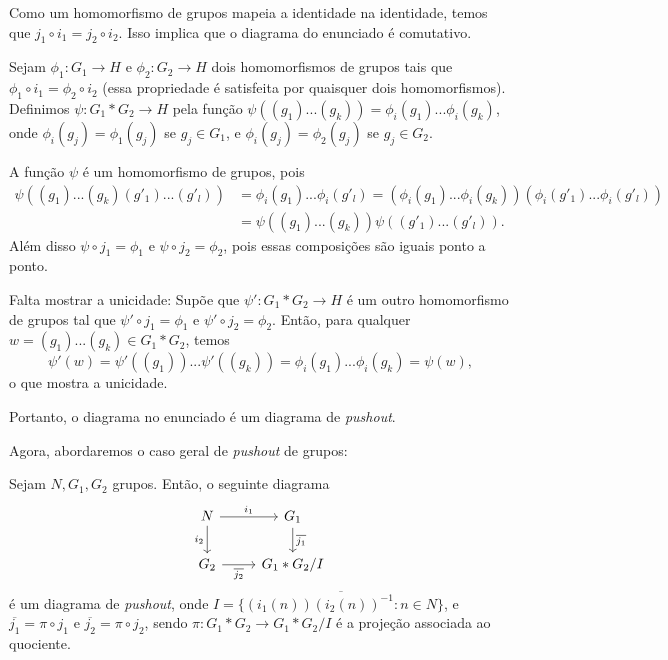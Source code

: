\begin{dem}
    Como um homomorfismo de grupos mapeia a identidade na identidade, temos que $j_1\circ i_1=j_2\circ i_2$. Isso implica que o diagrama do enunciado é comutativo.
    
    Sejam $\phi_1:G_1\rightarrow H$ e $\phi_2: G_2\rightarrow H$ dois homomorfismos de grupos tais que $\phi_1\circ i_1=\phi_2\circ i_2$ (essa propriedade é satisfeita por quaisquer dois homomorfismos). Definimos $\psi: G_1*G_2\rightarrow H$ pela função $\psi((g_1)...(g_k))=\phi_i(g_1)...\phi_i(g_k)$, onde $\phi_i(g_j)=\phi_1(g_j)$ se $g_j\in G_1$, e $\phi_i(g_j)=\phi_2(g_j)$ se $g_j\in G_2$. 
    
    A função $\psi$ é um homomorfismo de grupos, pois   
    \begin{align*}
    \psi((g_1)...(g_k)(g'_1)...(g'_l))&=\phi_i(g_1)...\phi_i(g'_l)=(\phi_i(g_1)...\phi_i(g_k))(\phi_i(g'_1)...\phi_i(g'_l))\\
    &=\psi((g_1)...(g_k))\psi((g'_1)...(g'_l)).
    \end{align*}
    Além disso $\psi\circ j_1=\phi_1$ e $\psi\circ j_2=\phi_2$, pois essas composições são iguais ponto a ponto. 
    
    Falta mostrar a unicidade: Supõe que $\psi':G_1*G_2\rightarrow H$ é um outro homomorfismo de grupos tal que $\psi'\circ j_1=\phi_1$ e $\psi'\circ j_2=\phi_2$. Então, para qualquer $w=(g_1)...(g_k)\in G_1* G_2$, temos 
    \[\psi'(w)=\psi'((g_1))...\psi'((g_k))=\phi_i(g_1)...\phi_i(g_k)=\psi(w),\]
    o que mostra a unicidade.
    
    Portanto, o diagrama no enunciado é um diagrama de \emph{pushout}.
\end{dem}

Agora, abordaremos o caso geral de \emph{pushout} de grupos:

\begin{thm}
    Sejam $N,G_1,G_2$ grupos. Então, o seguinte diagrama 
\[\begin{tikzcd}
	N & {G_1} \\
	{G_2} & {G_1*G_2/I}
	\arrow["{i_1}", from=1-1, to=1-2]
	\arrow["{i_2}"', from=1-1, to=2-1]
	\arrow["{\overline{j_1}}", from=1-2, to=2-2]
	\arrow["{\overline{j_2}}"', from=2-1, to=2-2]
\end{tikzcd}\]
é um diagrama de \emph{pushout}, onde $I=\overline{\{(i_1(n))(i_2(n))^{-1}:n\in N\}}$, e $\overline{j_1}=\pi\circ j_1$ e $\overline{j_2}=\pi\circ j_2$, sendo $\pi:G_1*G_2\rightarrow G_1* G_2/I$ é a projeção associada ao quociente.
\end{thm}

